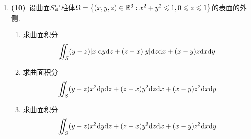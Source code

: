 \documentclass{ctexart}
\begin{document}
\begin{enumerate}[leftmargin=*,label=\textbf{\arabic*.}]
    \item \textbf{(10)}\ 设曲面$S$是柱体$\Omega=\left\{(x,y,z)\in\mathbb{R}^3:x^2+y^2\leqslant1,0\leqslant z\leqslant1\right\}$的表面的外侧.
    \begin{enumerate}[label=\tbf{(\arabic*)}]
        \item 求曲面积分
            \[\iint_S(y-z)|x|\mathrm{d} y\mathrm{d} z+(z-x)|y|\mathrm{d} z\mathrm{d} x+(x-y)z\mathrm{d} x\mathrm{d} y\]
        \item 求曲面积分
            \[\iint_S(y-z)x^2\mathrm{d} y\mathrm{d} z+(z-x)y^2\mathrm{d} z\mathrm{d} x+(x-y)z^2\mathrm{d} x\mathrm{d} y\]
        \item 求曲面积分
            \[\iint_S(y-z)x^3\mathrm{d} y\mathrm{d} z+(z-x)y^3\mathrm{d} z\mathrm{d} x+(x-y)z^3\mathrm{d} x\mathrm{d} y\]
    \end{enumerate}

\end{enumerate}
\end{document}
